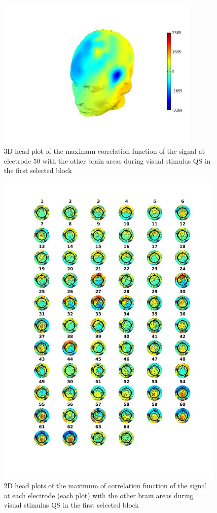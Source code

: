 \documentclass[a4paper]{article}
\begin{document}
\begin{figure}[H]
    \centering
    \includegraphics[width=10cm]{headplot2.jpg}
    \caption{3D head plot of the maximum correlation function of the signal at electrode 50 with the other brain areas during visual stimulus QS in the first selected block}
    \label{fig:headplot2}
\end{figure}


\begin{figure}[H]
    \centering
    \includegraphics[width=15cm]{topomapfun1.jpg}
    \caption{2D head plots of the maximum of correlation function of the signal at each electrode (each plot) with the other brain areas during visual stimulus QS in the first selected block}
    \label{fig:topomapfun1}
\end{figure}
\end{document}
